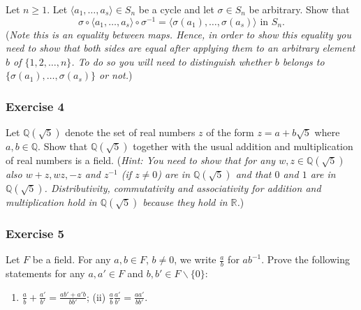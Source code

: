 \documentclass[
  12pt,
  a4paper,
  twoside]{article}
\providecommand{\tightlist}{%
  \setlength{\itemsep}{0pt}\setlength{\parskip}{0pt}}
\theoremstyle{plain}
\theoremstyle{definition}
\begin{document}
Let \(n \ge 1\). Let \(\langle a_1, \ldots, a_s \rangle \in S_n\)
be a cycle and let \(\sigma \in S_n\) be arbitrary. Show that
\[\sigma \circ \langle a_1, \ldots, a_s\rangle \circ \sigma^{-1} =
\langle \sigma(a_1), \ldots, \sigma(a_s)\rangle \textrm{ in }
S_n.\] (\emph{Note this is an equality between maps. Hence, in
order to show this equality you need to show that both sides
are equal after applying them to an arbitrary element \(b\) of
\(\{1, 2, \ldots, n\}\). To do so you will need to distinguish
whether \(b\) belongs to \(\{\sigma(a_1), \ldots, \sigma(a_s)\}\)
or not.})

\hypertarget{exercise-4-1}{%
\subsubsection*{Exercise 4}\label{exercise-4-1}}

Let \(\mathbb{Q}(\sqrt{5})\) denote the set of real numbers \(z\) of the
form \(z= a + b \sqrt{5}\) where \(a, b \in \mathbb{Q}\). Show that
\(\mathbb{Q}(\sqrt{5})\) together with the usual addition and
multiplication of real numbers is a field. (\emph{Hint: You need
to show that for any \(w,z \in \mathbb{Q}(\sqrt{5})\) also \(w+z, wz, -z\)
and \(z^{-1}\) (if \(z \not= 0\)) are in \(\mathbb{Q}(\sqrt{5})\) and that
\(0\) and \(1\) are in \(\mathbb{Q}(\sqrt{5})\). Distributivity,
commutativity and associativity for addition and multiplication
hold in \(\mathbb{Q}(\sqrt{5})\) because they hold in \(\mathbb{R}\).})

\hypertarget{exercise-5}{%
\subsubsection*{Exercise 5}\label{exercise-5}}

Let \(F\) be a field. For any \(a, b \in F\), \(b \not= 0\), we write
\(\frac{a}{b}\) for \(ab^{-1}\). Prove the following statements for
any \(a, a' \in F\) and \(b,b' \in F\backslash \{0\}\):

\begin{enumerate}
\def\labelenumi{(\roman{enumi})}
\tightlist
\item
  \(\displaystyle{\frac{a}{b} + \frac{a'}{b'} = \frac{ab'+a'b}{bb'}}\);
  \hspace{1cm} (ii) \(\displaystyle{\frac{a}{b}\frac{a'}{b'} = \frac{aa'}{bb'}}\).
\end{enumerate}
\end{document}
